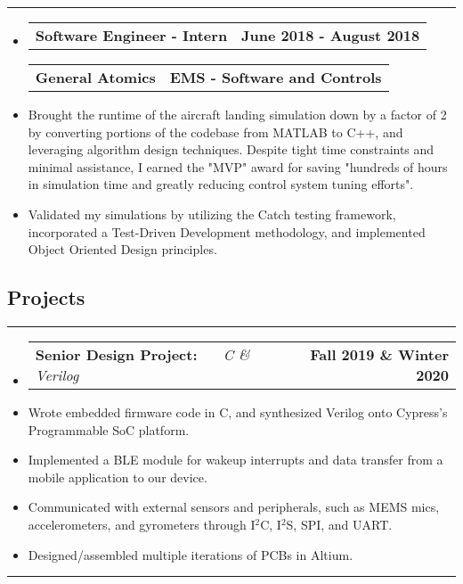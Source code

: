 \documentclass[10pt,letterpaper]{article}
\makeatletter
\newcommand{\header}[2]
{
	\begin{tabular*}{\linewidth}{l @{\extracolsep{\fill}} r}
		\hspace{-27pt} #1 & #2 \\
	\end{tabular*}
}
\newcommand{\sectionbreak}
{
	\vspace{-1.2em}
	\rule{\textwidth}{1.7pt}
	\vspace{-1.7em}
}
\makeatother
\begin{document}
\hrule

\begin{itemize}
	\item[]
		\header
			{\textbf{Software Engineer - Intern}} 
			{\textbf{June 2018 - August 2018}}
		\header
			{\textbf{General Atomics}}
			{\textbf{EMS - Software and Controls}} 
		\item
			Brought the runtime of the aircraft landing simulation down by a factor of 2 by converting portions of the codebase
			from MATLAB to C++, and leveraging algorithm design techniques. Despite tight time constraints and minimal assistance,
			I earned the "MVP" award for saving "hundreds of hours in simulation time and greatly reducing control system tuning efforts".
		\item
			Validated my simulations by utilizing the Catch testing framework, incorporated a Test-Driven Development methodology, and 
			implemented Object Oriented Design principles.


\end{itemize}

\vspace{-1.5em}

\subsection*{Projects}
\sectionbreak


\begin{itemize}
	\item[]
		\header
		{
			\textbf{Senior Design Project: }
			\emph{\smash{Smart Dog Collar}} \ \ \ \footnotesize \emph{C \& Verilog}
		}
			{\textbf{Fall 2019 \& Winter 2020}}
		\item 
			Wrote embedded firmware code in C, and synthesized Verilog onto Cypress's Programmable SoC platform.
		\item 
			Implemented a BLE module for wakeup interrupts and data transfer from a mobile application to our device. 
		\item 
			Communicated with external sensors and peripherals, such as MEMS mics, accelerometers, and gyrometers through I$^{2}$C, I$^{2}$S, SPI, and UART. 
		\item 
			Designed/assembled multiple iterations of PCBs in Altium.

\end{itemize}

\hrule
\end{document}
